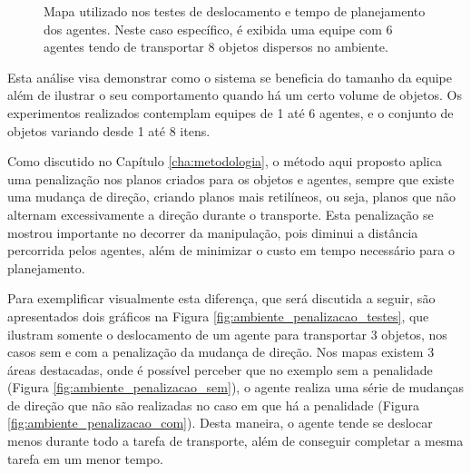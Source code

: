 
\begin{figure}[htpb]
  \centering
  \setlength{\fboxsep}{0pt}
  \caption[Mapa utilizado nos testes de deslocamento e tempo de planejamento dos agentes]{Mapa utilizado nos testes de deslocamento e tempo de planejamento dos agentes. Neste caso específico, é exibida uma equipe com 6 agentes tendo de transportar 8 objetos dispersos no ambiente.}
  \label{fig:ambiente_penalizacao}
\end{figure}

Esta análise visa demonstrar como o sistema se beneficia do tamanho da equipe além de ilustrar o seu comportamento quando há um certo volume de objetos.
Os experimentos realizados contemplam equipes de 1 até 6 agentes, e o conjunto de objetos variando desde 1 até 8 itens.

Como discutido no Capítulo \ref{cha:metodologia}, o método aqui proposto aplica uma penalização nos planos criados para os objetos e agentes, sempre que existe uma mudança de direção, criando planos mais retilíneos, ou seja, planos que não alternam excessivamente a direção durante o transporte.
Esta penalização se mostrou importante no decorrer da manipulação, pois diminui a distância percorrida pelos agentes, além de minimizar o custo em tempo necessário para o planejamento.


Para exemplificar visualmente esta diferença, que será discutida a seguir, são apresentados dois gráficos na Figura \ref{fig:ambiente_penalizacao_testes}, que ilustram somente o deslocamento de um agente para transportar 3 objetos, nos casos sem e com a penalização da mudança de direção.
Nos mapas existem 3 áreas destacadas, onde é possível perceber que no exemplo sem a penalidade (Figura \ref{fig:ambiente_penalizacao_sem}), o agente realiza uma série de mudanças de direção que não são realizadas no caso em que há a penalidade (Figura \ref{fig:ambiente_penalizacao_com}).
Desta maneira, o agente tende se deslocar menos durante todo a tarefa de transporte, além de conseguir completar a mesma tarefa em um menor tempo.

